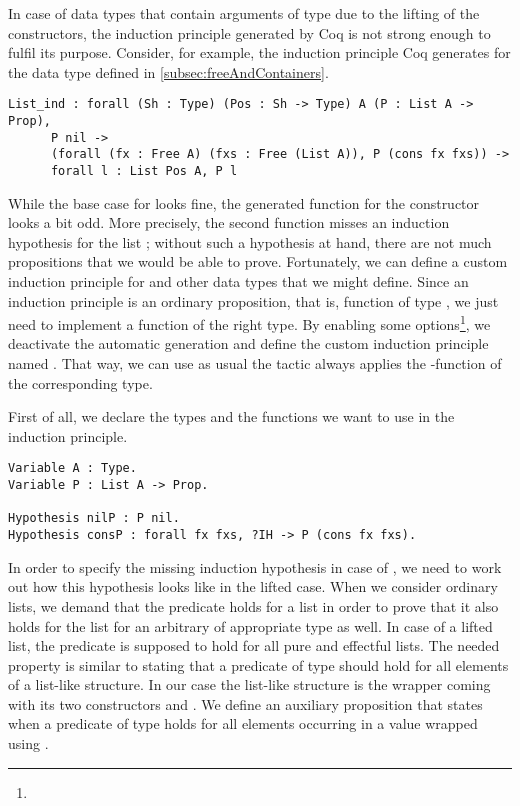 In case of data types that contain arguments of type  due
to the lifting of the constructors, the induction principle generated
by Coq is not strong enough to fulfil its purpose.
Consider, for example, the induction principle Coq generates for the
 data type defined in \autoref{subsec:freeAndContainers}.

\begin{verbatim}
List_ind : forall (Sh : Type) (Pos : Sh -> Type) A (P : List A -> Prop),
      P nil ->
      (forall (fx : Free A) (fxs : Free (List A)), P (cons fx fxs)) ->
      forall l : List Pos A, P l
\end{verbatim}

While the base case for  looks fine, the generated function
for the  constructor looks a bit odd.
More precisely, the second function misses an induction hypothesis for
the list ; without such a hypothesis at hand, there are not
much propositions that we would be able to prove.
Fortunately, we can define a custom induction principle for
 and other data types that we might define.
Since an induction principle is an ordinary proposition, that is,
function of type , we just need to implement a function of
the right type.
By enabling some options\footnote{},
we deactivate the automatic generation and define the custom induction
principle named .
That way, we can use  as usual the tactic always
applies the -function of the corresponding type.

First of all, we declare the types and the functions we want to use in
the induction principle.

\begin{verbatim}
Variable A : Type.
Variable P : List A -> Prop.

Hypothesis nilP : P nil.
Hypothesis consP : forall fx fxs, ?IH -> P (cons fx fxs).
\end{verbatim}

In order to specify the missing induction hypothesis in case of
, we need to work out how this hypothesis looks like in the
lifted case.
When we consider ordinary lists, we demand that the predicate holds
for a list  in order to prove that it also holds for the list
 for an arbitrary  of appropriate type as
well.
In case of a lifted list, the predicate is supposed to hold for all
pure and effectful lists.
The needed property is similar to stating that a predicate of type
 should hold for all elements of a list-like
structure.
In our case the list-like structure is the  wrapper coming
with its two constructors  and .
We define an auxiliary proposition  that states when a
predicate of type  holds for all elements occurring in
a value wrapped using .

